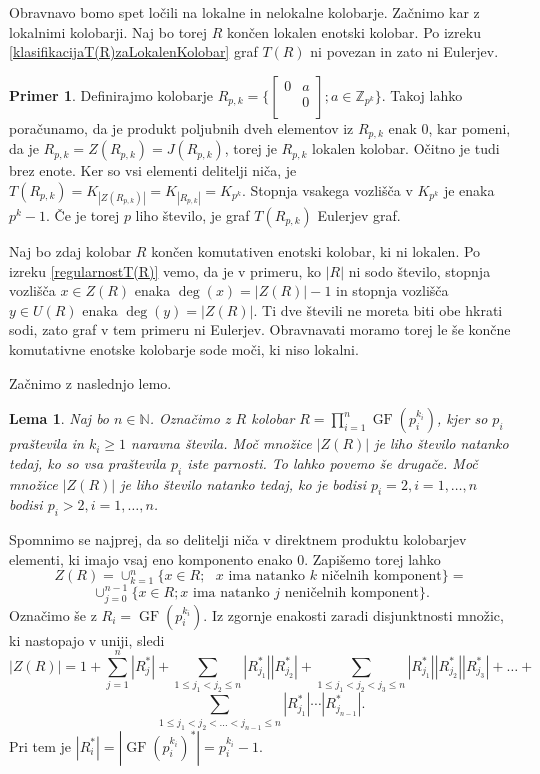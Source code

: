 \documentclass[a4paper, 12pt]{amsart}
\theoremstyle{definition} %
\newtheorem{primer}[definicija]{Primer}
\theoremstyle{plain} %
\newtheorem{lema}[definicija]{Lema}
\newcommand{\N}{\mathbb N}
\newcommand{\Z}{\mathbb Z}
\DeclareMathOperator{\GF}{GF}
\begin{document}
Obravnavo bomo spet ločili na lokalne in nelokalne kolobarje. Začnimo kar z lokalnimi kolobarji. Naj bo torej $R$ končen lokalen enotski kolobar. Po izreku  \ref{klasifikacijaT(R)zaLokalenKolobar} graf $T(R)$ ni povezan in zato ni Eulerjev. 

\begin{primer}
Definirajmo kolobarje $R_{p,k} = \big\{  
\begin{bmatrix}
0 & a \\
 & 0\\
\end{bmatrix};
a \in \Z_{p^k}
\big\}
$. 
Takoj lahko poračunamo, da je produkt poljubnih dveh elementov iz $R_{p,k}$ enak 0, kar pomeni, da je $R_{p,k} = Z(R_{p,k}) = J(R_{p,k})$, torej je $R_{p,k}$ lokalen kolobar. Očitno je tudi brez enote. Ker so vsi elementi delitelji niča, je $T(R_{p,k}) = K_{|Z(R_{p,k})|} = K_{|R_{p,k}|} = K_{p^k}$. Stopnja vsakega vozlišča v $K_{p^k}$ je enaka $p^k -1$. Če je torej $p$ liho število, je graf $T(R_{p,k})$ Eulerjev graf.
\end{primer}

Naj bo zdaj kolobar $R$ končen komutativen enotski kolobar, ki ni lokalen. Po izreku  \ref{regularnostT(R)} vemo, da je v primeru, ko $|R|$ ni sodo število, stopnja vozlišča $x\in Z(R)$ enaka $\deg(x) = |Z(R)| -1$ in stopnja vozlišča $y\in U(R)$ enaka $\deg(y) = |Z(R)|$. Ti dve števili ne moreta biti obe hkrati sodi, zato graf v tem primeru ni Eulerjev.
Obravnavati moramo torej le še končne komutativne enotske kolobarje sode moči, ki niso lokalni. 

Začnimo z naslednjo lemo.

\begin{lema}
Naj bo $n\in \N$. Označimo z $R$ kolobar $R=\prod_{i=1}^n \GF(p_i^{k_i})$, kjer so $p_i$ praštevila in $k_i\ge 1$ naravna števila. Moč množice $|Z(R)|$ je liho število natanko tedaj, ko so vsa praštevila $p_i$ iste parnosti. To lahko povemo še drugače. Moč množice $|Z(R) |$ je liho število natanko tedaj, ko je bodisi $p_i =2, i=1,\dots,n$ bodisi $p_i > 2, i =1,\dots,n$.
\end{lema}

\proof
Spomnimo se najprej, da so delitelji niča v direktnem produktu kolobarjev elementi, ki imajo vsaj eno komponento enako 0. Zapišemo torej lahko 
$$
Z(R) = \cup_{k=1}^n \{x\in R; \text{ $x$ ima natanko $k$ ničelnih komponent}\}=
$$
$$
\cup_{j=0}^{n-1} \{ x\in R; \text{$x$ ima natanko $j$ neničelnih komponent} \}.
$$
Označimo še z $R_i = \GF(p_i^{k_i})$. Iz zgornje enakosti zaradi disjunktnosti množic, ki nastopajo v uniji, sledi 
$$|Z(R)| = 1+ \sum_{j=1}^n |R_j^*| + \sum_{1\le j_1 < j_2 \le n} |R_{j_1}^*| |R_{j_2}^*| +  \sum_{1\le j_1 < j_2<j_3 \le n} |R_{j_1}^*| |R_{j_2}^*| |R_{j_3}^*|  + \dots + 
$$
$$
 \sum_{1\le j_1 < j_2 <\dots< j_{n-1}\le n} |R_{j_1}^*|\cdots  |R_{j_{n-1}}^*|. 
$$
Pri tem je $|R_i^*| = |\GF(p_i^{k_i})^*| = p_i^{k_i} - 1$. 
\end{document}
